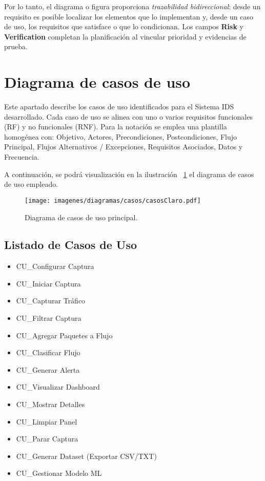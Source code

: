 Por lo tanto, el diagrama o figura proporciona \emph{trazabilidad bidireccional}: desde un requisito es posible localizar los elementos que lo implementan y, desde un caso de uso, los requisitos que satisface o que lo condicionan. Los campos \textbf{Risk} y \textbf{Verification} completan la planificación al vincular prioridad y evidencias de prueba.

\section{Diagrama de casos de uso}
Este apartado describe los casos de uso identificados para el Sistema IDS desarrollado. Cada caso de uso se alinea con uno o varios requisitos funcionales (RF) y no funcionales (RNF). Para la notación se emplea una plantilla homogénea con: Objetivo, Actores, Precondiciones, Postcondiciones, Flujo Principal, Flujos Alternativos / Excepciones, Requisitos Asociados, Datos y Frecuencia.

A continuación, se podrá visualización en la ilustración ~\ref{fig:diagCasosUso} el diagrama de casos de uso empleado.
\begin{figure}[ht!] \centering \texttt{[image: 
imagenes/diagramas/casos/casosClaro.pdf]} \caption{Diagrama de casos de uso principal.} \label{fig:diagCasosUso} \end{figure}


\subsection{Listado de Casos de Uso}
\begin{itemize}
  \item CU\_Configurar Captura
  \item CU\_Iniciar Captura
  \item CU\_Capturar Tráfico
  \item CU\_Filtrar Captura
  \item CU\_Agregar Paquetes a Flujo
  \item CU\_Clasificar Flujo
  \item CU\_Generar Alerta
  \item CU\_Visualizar Dashboard
  \item CU\_Mostrar Detalles
  \item CU\_Limpiar Panel
  \item CU\_Parar Captura
  \item CU\_Generar Dataset (Exportar CSV/TXT)
  \item CU\_Gestionar Modelo ML
\end{itemize}

